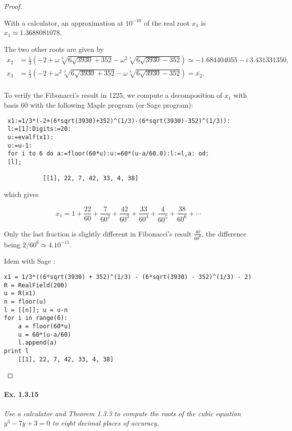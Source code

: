 \documentclass[11pt,a4paper]{article}
\begin{document}
\begin{proof}
\begin{enumerate}
\end{enumerate}

With a calculator, an approximation at $10^{-10}$ of the real root $x_1$ is $x_1 \simeq 1.3688081078$.

The two other roots are given by
\begin{align*}
x_2 &= \frac{1}{3}\left(-2+\omega \sqrt[3]{6\sqrt{3930}+352}-\omega^2 \sqrt[3]{6\sqrt{3930}-352}\right) \simeq -1.684404055 - i \ 3.431331350,\\
x_3 &=  \frac{1}{3}\left(-2+\omega^2 \sqrt[3]{6\sqrt{3930}+352}-\omega \sqrt[3]{6\sqrt{3930}-352}\right) = \overline{x_2}.\\
\end{align*}


To verify the Fibonacci's result  in 1225, we compute a decomposition of $x_1$ with basis 60 with the following Maple program (or Sage program):

\begin{verbatim}
 x1:=1/3*(-2+(6*sqrt(3930)+352)^(1/3)-(6*sqrt(3930)-352)^(1/3)):
 l:=[1]:Digits:=20:
 u:=evalf(x1):
 u:=u-1:
 for i to 6 do a:=floor(60*u):u:=60*(u-a/60.0):l:=l,a: od:
 [l];

           [[1], 22, 7, 42, 33, 4, 38]
\end{verbatim}

which gives

$$x_1= 1 + \frac{22}{60} + \frac{7}{60^2} + \frac{42}{60^3} + \frac{33}{60^4} + \frac{4}{60^5} + \frac{38}{60^6}+ \cdots$$

Only the last fraction is slightly different  in Fibonacci's result $\frac{40}{60^6}$, the difference being $2/60^6 \simeq 4. 10^{-11}$.

Idem with Sage :
\begin{verbatim}
x1 = 1/3*((6*sqrt(3930) + 352)^(1/3) - (6*sqrt(3930) - 352)^(1/3) - 2)
R = RealField(200)
u = R(x1)
n = floor(u)
l = [[n]]; u = u-n
for i in range(6):
    a = floor(60*u)
    u = 60*(u-a/60)
    l.append(a)    
print l
	[[1], 22, 7, 42, 33, 4, 38]
\end{verbatim}
\end{proof}

\paragraph{Ex. 1.3.15}

{\it Use a calculator and Theorem 1.3.3 to compute the roots of the cubic equation $y^3-7y+3 = 0$ to eight decimal places of accuracy.
}
\end{document}
